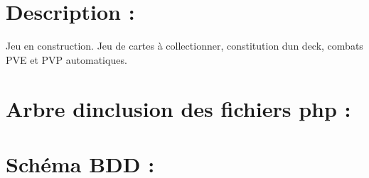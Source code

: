 \hypertarget{index_desc}{}\section{Description \+:}\label{index_desc}
Jeu en construction. Jeu de cartes à collectionner, constitution d\textquotesingle{}un deck, combats P\+VE et P\+VP automatiques.~\newline
\hypertarget{index_inclusion}{}\section{Arbre d\textquotesingle{}inclusion des fichiers php \+:}\label{index_inclusion}
 \hypertarget{index_BDD}{}\section{Schéma B\+D\+D \+:}\label{index_BDD}
 